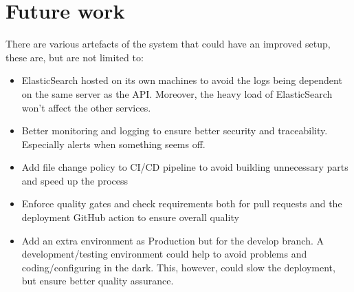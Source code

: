\documentclass[10pt]{article}
\newcommand{\backmatter}{\clearpage \cfoot{\thepage\ }
\fancyhead{}
\renewcommand{\headrulewidth}{0pt}
\setcounter{page}{1}
\pagenumbering{alph}}
\begin{document}
\section{Future work}
There are various artefacts of the system that could have an improved setup, these are, but are not limited to:
\begin{itemize}
    \item ElasticSearch hosted on its own machines to avoid the logs being dependent on the same server as the API. Moreover, the heavy load of ElasticSearch won't affect the other services.
    \item Better monitoring and logging to ensure better security and traceability. Especially alerts when something seems off.
    \item Add file change policy to CI/CD pipeline to avoid building unnecessary parts and speed up the process
    \item Enforce quality gates and check requirements both for pull requests and the deployment GitHub action to ensure overall quality
    \item Add an extra environment as Production but for the develop branch. A development/testing environment could help to avoid problems and coding/configuring in the dark. This, however, could slow the deployment, but ensure better quality assurance.
\end{itemize}

\label{LastPage}

\backmatter 
\printbibliography

\newpage

\appendix
\end{document}
